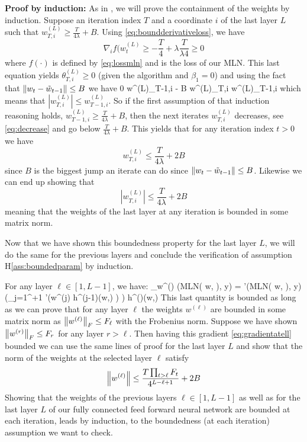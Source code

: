 \documentclass[11pt]{article}
\makeatletter
\renewenvironment{proof}[1][\proofname]{%
   \par\pushQED{\qed}\normalfont%
   \topsep6\p@\@plus6\p@\relax
   \trivlist\item[\hskip\labelsep\bfseries#1]%
   \ignorespaces
}{%
   \popQED\endtrivlist\@endpefalse
}
\theoremstyle{k}
\makeatother
\begin{document}
\begin{proof}
\textbf{Proof by induction:} As in \citep{defossez2020convergence}, we will prove the containment of the weights by induction.
Suppose an iteration index $T$ and a coordinate $i$ of the last layer $L$ such that $w^{(L)}_{T, i} \geq \frac{T}{4\lambda} + B$.
Using \eqref{eq:boundderivativeloss}, we have
$$
\nabla_i f(w^{(L)}_t\geq - \frac{T}{4} + \lambda \frac{T}{\lambda4} \geq 0
$$
where $f(\cdot)$ is defined by \eqref{eq:lossmln} and is the loss of our MLN.
This last equation yields $\theta^{(L)}_{T,i} \geq 0$ (given the algorithm and $\beta_1 = 0$) and using the fact that $\left\Vert w_t - \tilde{w}_{t-1} \right\Vert \leq B$ we have
\beq\label{eq:decrease}
0 \leq w^{(L)}_{T-1,i} - B \leq w^{(L)}_{T,i} \leq w^{(L)}_{T-1,i}
\eeq
which means that $| w^{(L)}_{T,i}| \leq w^{(L)}_{T-1,i}$.
So if the first assumption of that induction reasoning holds, \ie $w^{(L)}_{T-1, i} \geq \frac{T}{4\lambda} + B$, then the next iterates $w^{(L)}_{T, i}$ decreases, see \eqref{eq:decrease} and go below $\frac{T}{4\lambda} + B$. This yields that for any iteration index $t >0$ we have 
$$
w^{(L)}_{T, i} \leq \frac{T}{4\lambda} + 2B
$$
since $B$ is the biggest jump an iterate can do since $\left\Vert w_t - \tilde{w}_{t-1} \right\Vert \leq B$.
Likewise we can end up showing that 
$$
|w^{(L)}_{T, i}| \leq \frac{T}{4\lambda} + 2B
$$
meaning that the weights of the last layer at any iteration is bounded in some matrix norm.

Now that we have shown this boundedness property for the last layer $L$, we will do the same for the previous layers and conclude the verification of assumption H\ref{ass:boundedparam} by induction.

For any layer $\ell \in [1, L-1]$, we have:
\beq\label{eq:gradientatell}
\nabla_{w^{(\ell)}}  (\textsf{MLN}( w, \xi), y)  =  '(\textsf{MLN}( w, \xi), y) \left(\prod_{j=1}^{\ell+1} \sigma'\left(w^{(j)} h^{(j-1)}(w,\xi) \right) \right) h^{()}(w,\xi) 
\eeq
This last quantity is bounded as long as we can prove that for any layer $\ell$ the weights $w^{(\ell)}$ are bounded in some matrix norm as $\left\Vert w^{(\ell)} \right\Vert_{F} \leq F_\ell$ with the Frobenius norm.
Suppose we have shown $\left\Vert w^{(r)} \right\Vert_{F} \leq F_r$ for any layer $r > \ell$. 
Then having this gradient \eqref{eq:gradientatell} bounded we can use the same lines of proof for the last layer $L$ and show that the norm of the weights at the selected layer $\ell$ satisfy
$$
\left\Vert w^{(\ell)} \right\Vert \leq \frac{T \prod_{t > \ell} F_t}{4^{L-\ell+1}} + 2B
$$
Showing that the weights of the previous layers $\ell \in [1, L-1]$ as well as for the last layer $L$ of our fully connected feed forward neural network are bounded at each iteration, leads by induction, to the boundedness (at each iteration) assumption we want to check.
\end{proof}
\end{document}

